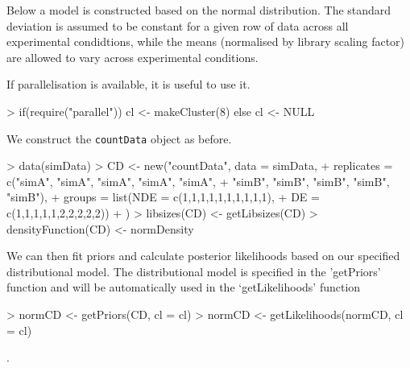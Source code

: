 \documentclass[a4paper]{article}
\begin{document}
Below a model is constructed based on the normal distribution. The standard deviation is assumed to be constant for a given row of data across all experimental condidtions, while the means (normalised by library scaling factor) are allowed to vary across experimental conditions.


If parallelisation is available, it is useful to use it.

\begin{Schunk}
\begin{Sinput}
> if(require("parallel")) cl <- makeCluster(8) else cl <- NULL
\end{Sinput}
\end{Schunk}

\begin{Schunk}
\end{Schunk}

We construct the \verb'countData' object as before.

\begin{Schunk}
\begin{Sinput}
> data(simData)
> CD <- new("countData", data = simData, 
+           replicates = c("simA", "simA", "simA", "simA", "simA",
+             "simB", "simB", "simB", "simB", "simB"),
+           groups = list(NDE = c(1,1,1,1,1,1,1,1,1,1),
+                          DE = c(1,1,1,1,1,2,2,2,2,2))
+           )
> libsizes(CD) <- getLibsizes(CD)
> densityFunction(CD) <- normDensity
\end{Sinput}
\end{Schunk}

We can then fit priors and calculate posterior likelihoods based on our specified distributional model.  The distributional model is specified in the 'getPriors' function and will be automatically used in the `getLikelihoods' function

\begin{Schunk}
\begin{Sinput}
> normCD <- getPriors(CD, cl = cl)
> normCD <- getLikelihoods(normCD, cl = cl)
\end{Sinput}
\begin{Soutput}
.
\end{Soutput}
\end{Schunk}
\end{document}
